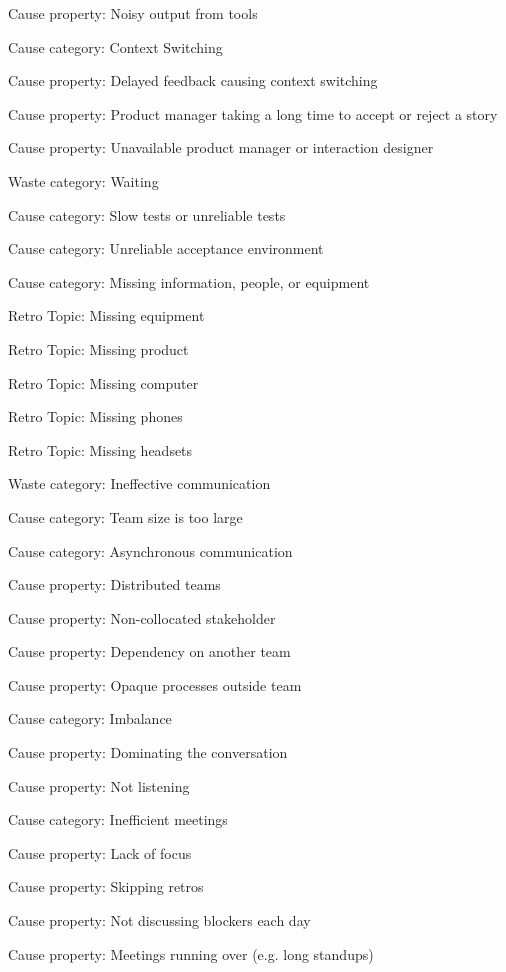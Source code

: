 {{\quad \quad Cause property: Noisy output from tools

\quad Cause category: Context Switching

\quad \quad Cause property: Delayed feedback causing context switching

\quad \quad Cause property: Product manager taking a long time to accept or reject a story

\quad \quad Cause property: Unavailable product manager or interaction designer


Waste category: Waiting

\quad Cause category: Slow tests or unreliable tests

\quad Cause category: Unreliable acceptance environment

\quad Cause category: Missing information, people, or equipment

\quad \quad Retro Topic: Missing equipment

\quad \quad Retro Topic: Missing product

\quad \quad Retro Topic: Missing computer

\quad \quad Retro Topic: Missing phones

\quad \quad Retro Topic: Missing headsets


Waste category: Ineffective communication

\quad Cause category: Team size is too large

\quad Cause category: Asynchronous communication

\quad \quad Cause property: Distributed teams

\quad \quad Cause property: Non-collocated stakeholder

\quad \quad Cause property: Dependency on another team

\quad \quad Cause property: Opaque processes outside team

\quad Cause category: Imbalance

\quad \quad Cause property: Dominating the conversation

\quad \quad Cause property: Not listening

\quad Cause category: Inefficient meetings

\quad \quad Cause property: Lack of focus

\quad \quad Cause property: Skipping retros

\quad \quad Cause property: Not discussing blockers each day

\quad \quad Cause property: Meetings running over (e.g. long standups)


}}
